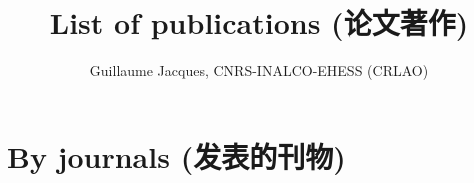 \documentclass[oneside,a4paper,11pt]{article}
\newcommand{\zh}[1]{{\cn #1}}
\newcommand{\langue}[2]{#1}
\newcommand{\lingua}[3]{#1 (\zh{#3})}
\begin{document}
  \title{\lingua{List of publications}{Liste de publications}{论文著作}}
 
\author{Guillaume Jacques, CNRS-INALCO-EHESS (CRLAO)}
\maketitle
\sloppy
 
 \tableofcontents
  
 \section{\lingua{By journals}{Articles classés par revue}{发表的刊物}}
\end{document}
